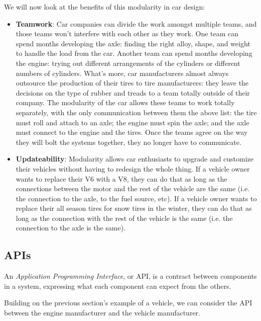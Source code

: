 We will now look at the benefits of this modularity in car design:

\begin{itemize}
\item \textbf{Teamwork}: Car companies can divide the work amongst multiple
  teams, and those teams won't interfere with each other as they work. One team
  can spend months developing the axle: finding the right alloy, shape, and
  weight to handle the load from the car. Another team can spend months
  developing the engine: trying out different arrangements of the cylinders or
  different numbers of cylinders. What's more, car manufacturers almost always
  outsource the production of their tires to tire manufacturers: they leave the
  decisions on the type of rubber and treads to a team totally outside of their
  company. The modularity of the car allows these teams to work totally
  separately, with the only communication between them the above list: the tire
  must roll and attach to an axle; the engine must spin the axle; and the axle
  must connect to the engine and the tires. Once the teams agree on the way they
  will bolt the systems together, they no longer have to communicate.
    
\item \textbf{Updateability}: Modularity allows car enthusiasts to upgrade and
  customize their vehicles without having to redesign the whole thing. If a
  vehicle owner wants to replace their V6 with a V8, they can do that as long as
  the connections between the motor and the rest of the vehicle are the same
  (i.e. the connection to the axle, to the fuel source, etc). If a vehicle owner
  wants to replace their all season tires for snow tires in the winter, they can
  do that as long as the connection with the rest of the vehicle is the same
  (i.e. the connection to the axle is the same).
\end{itemize}

\subsection{APIs}
\begin{definition}
An \emph{Application Programming Interface}, or API, is a contract between components in a system, expressing what each component can expect from the others. 
\end{definition}

Building on the previous section's example of a vehicle, we can consider the API between the engine manufacturer and the vehicle manufacturer. 

